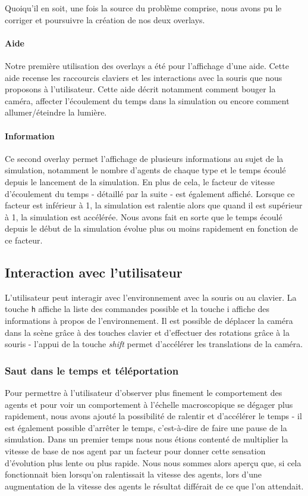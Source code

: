 Quoiqu'il en soit, une fois la source du problème comprise, nous avons pu
le corriger et poursuivre la création de nos deux overlays.

\paragraph{Aide}
Notre première utilisation des overlays a été pour l'affichage d'une aide.
Cette aide recense les raccourcis claviers et les interactions avec la souris
que nous proposons à l'utilisateur. Cette aide décrit notamment comment bouger
la caméra, affecter l'écoulement du temps dans la simulation ou encore comment
allumer/éteindre la lumière.

\paragraph{Information}
Ce second overlay permet l'affichage de plusieurs informations au sujet de la
simulation, notamment le nombre d'agents de chaque type et le temps écoulé
depuis le lancement de la simulation.
En plus de cela, le facteur de vitesse d'écoulement du temps - détaillé par la
suite - est également affiché. Lorsque ce facteur est inférieur à 1, la
simulation est ralentie alors que quand il est supérieur à 1, la simulation
est accélérée. Nous avons fait en sorte que le temps écoulé depuis le début de
la simulation évolue plus ou moins rapidement en fonction de ce facteur.

\subsection{Interaction avec l'utilisateur}

L'utilisateur peut interagir avec l'environnement avec la souris ou au
clavier. La touche \verb!h! affiche la liste des commandes possible et la
touche i affiche des informations à propos de l'environnement.
Il est possible de déplacer la caméra dans la scène grâce à des touches
clavier et d'effectuer des rotations grâce à la souris - l'appui de la touche
\emph{shift} permet d'accélérer les translations de la caméra.

\subsubsection{Saut dans le temps et téléportation}
Pour permettre à l'utilisateur d'observer plus finement le comportement des
agents et pour voir un comportement à l'échelle macroscopique se dégager plus
rapidement, nous avons ajouté la possibilité de ralentir et d'accélérer le
temps - il est également possible d'arrêter le temps, c'est-à-dire de faire
une pause de la simulation. Dans un premier temps nous nous étions contenté de
multiplier la vitesse de base de nos agent par un facteur pour donner cette
sensation d'évolution plus lente ou plus rapide. Nous nous sommes alors aperçu
que, si cela fonctionnait bien lorsqu'on ralentissait la vitesse des agents,
lors d'une augmentation de la vitesse des agents le résultat différait de ce
que l'on attendait.

